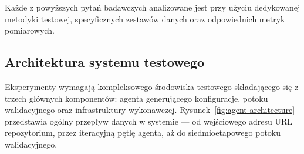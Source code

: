\bigskip
\noindent
Każde z powyższych pytań badawczych analizowane jest przy użyciu dedykowanej metodyki testowej, specyficznych zestawów danych oraz odpowiednich metryk pomiarowych.

\subsection{Architektura systemu testowego}

Eksperymenty wymagają kompleksowego środowiska testowego składającego się z trzech głównych komponentów: agenta generującego konfiguracje, potoku walidacyjnego oraz infrastruktury wykonawczej. Rysunek~\ref{fig:agent-architecture} przedstawia ogólny przepływ danych w systemie — od wejściowego adresu URL repozytorium, przez iteracyjną pętlę agenta, aż do siedmioetapowego potoku walidacyjnego.

